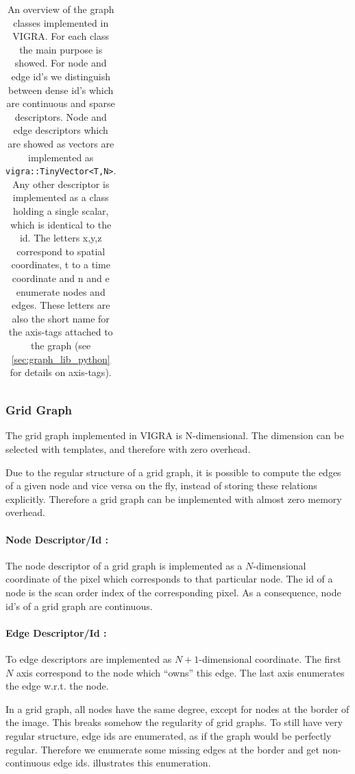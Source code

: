 \begin{table}[H]
\begin{tiny}
\begin{tabular}{|l|p{1.5cm}|p{0.5cm}|p{0.5cm}|p{0.6cm}|p{0.6cm}|p{0.6cm}|p{0.8cm}|p{0.8cm}|l|l|l|}
\end{tabular}
\end{tiny}
\caption[VIGRA's graph classes]{ \label{tab:graph_classes}
    An overview of the graph classes implemented in VIGRA.
    For each class the main purpose is showed.
    For node and edge id's we distinguish between dense id's
    which are continuous and sparse descriptors.
    Node and edge descriptors which are showed as vectors 
    are implemented as \lstinline{vigra::TinyVector<T,N>}.
    Any other descriptor is implemented as a class holding
    a single scalar, which is identical to the id.
    The letters x,y,z correspond to spatial coordinates, t to a time coordinate
    and n and e enumerate nodes and edges.
    These letters are also the short name for the axis-tags attached to the
    graph (see \cref{sec:graph_lib_python} for details on axis-tags).
}
\end{table}


\subsubsection{Grid Graph} \label{sec:graphs_grid_graph}

The grid graph implemented in VIGRA is N-dimensional.
The dimension can be selected with templates, and therefore with zero
overhead.

Due to the regular structure of a grid graph, it is possible to compute the edges of a given 
node and vice versa on the fly, instead of storing these relations explicitly.
Therefore a grid graph can be implemented with almost zero memory overhead.

\paragraph{Node Descriptor/Id :}
The node descriptor of a grid graph is implemented as a
$N$-dimensional coordinate of the pixel which corresponds to
that particular node. The id of a node is the scan order index
of the corresponding pixel.
As a consequence, node id's of a grid graph are continuous.
\paragraph{Edge Descriptor/Id :}
To edge descriptors are implemented as $N+1$-dimensional coordinate.
The first $N$ axis correspond to the node which ``owns'' this edge.
The last axis enumerates the edge w.r.t. the node.

In a grid graph, all nodes have the same degree, except for nodes
at the border of the image.
This breaks somehow the regularity of grid graphs.
To still have very regular structure, edge ids
are enumerated, as if the graph would be perfectly
regular. Therefore we enumerate some missing edges
at the border and get non-continuous edge ids.
 illustrates this enumeration.



